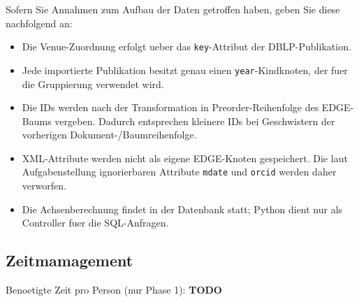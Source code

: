 \documentclass[11pt]{scrartcl}
\begin{document}
Sofern Sie Annahmen zum Aufbau der Daten getroffen haben, geben Sie diese nachfolgend an:
\begin{itemize}
	\item Die Venue-Zuordnung erfolgt ueber das \texttt{key}-Attribut der DBLP-Publikation.
	\item Jede importierte Publikation besitzt genau einen \texttt{year}-Kindknoten, der fuer die Gruppierung verwendet wird.
	\item Die IDs werden nach der Transformation in Preorder-Reihenfolge des EDGE-Baums vergeben. Dadurch entsprechen kleinere IDs bei Geschwistern der vorherigen Dokument-/Baumreihenfolge.
	\item XML-Attribute werden nicht als eigene EDGE-Knoten gespeichert. Die laut Aufgabenstellung ignorierbaren Attribute \texttt{mdate} und \texttt{orcid} werden daher verworfen.
	\item Die Achsenberechnung findet in der Datenbank statt; Python dient nur als Controller fuer die SQL-Anfragen.
\end{itemize}

\subsection*{Zeitmamagement}

Benoetigte Zeit pro Person (nur Phase 1): \textbf{TODO}
\end{document}
